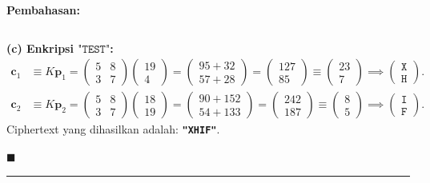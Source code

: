 \documentclass[11pt,a4paper]{article}
\newenvironment{solusi}{\noindent\textbf{\textsf{Pembahasan:}}\par\vspace{0.2em}}{\hfill$\blacksquare$\vspace{1em}\par\hrule\vspace{1em}}
\begin{document}
\begin{solusi}
\[\]

\vspace{0.2cm}
\textbf{(c) Enkripsi $\texttt{"TEST"}$:}
\begin{align*}
\mathbf{c}_1 &\equiv K \mathbf{p}_1 = \begin{pmatrix} 5 & 8 \\ 3 & 7 \end{pmatrix} \begin{pmatrix} 19 \\ 4 \end{pmatrix} = \begin{pmatrix} 95 + 32 \\ 57 + 28 \end{pmatrix} = \begin{pmatrix} 127 \\ 85 \end{pmatrix} \equiv \begin{pmatrix} 23 \\ 7 \end{pmatrix} \implies \begin{pmatrix} \texttt{X} \\ \texttt{H} \end{pmatrix}. \\
\mathbf{c}_2 &\equiv K \mathbf{p}_2 = \begin{pmatrix} 5 & 8 \\ 3 & 7 \end{pmatrix} \begin{pmatrix} 18 \\ 19 \end{pmatrix} = \begin{pmatrix} 90 + 152 \\ 54 + 133 \end{pmatrix} = \begin{pmatrix} 242 \\ 187 \end{pmatrix} \equiv \begin{pmatrix} 8 \\ 5 \end{pmatrix} \implies \begin{pmatrix} \texttt{I} \\ \texttt{F} \end{pmatrix}.
\end{align*}
Ciphertext yang dihasilkan adalah: \textbf{\texttt{"XHIF"}}.


\end{solusi}
\end{document}
